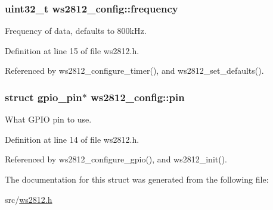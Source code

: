 \hypertarget{structws2812__config_a15634a419d7f20275ec1e6ba1215920b}{}
\subsubsection[{frequency}]{\setlength{\rightskip}{0pt plus 5cm}uint32\+\_\+t ws2812\+\_\+config\+::frequency}\label{structws2812__config_a15634a419d7f20275ec1e6ba1215920b}


Frequency of data, defaults to 800k\+Hz. 



Definition at line 15 of file ws2812.\+h.



Referenced by ws2812\+\_\+configure\+\_\+timer(), and ws2812\+\_\+set\+\_\+defaults().

\hypertarget{structws2812__config_a665ce3190145f97af1d234f9de5defc1}{}
\subsubsection[{pin}]{\setlength{\rightskip}{0pt plus 5cm}struct {\bf gpio\+\_\+pin}$\ast$ ws2812\+\_\+config\+::pin}\label{structws2812__config_a665ce3190145f97af1d234f9de5defc1}


What G\+P\+I\+O pin to use. 



Definition at line 14 of file ws2812.\+h.



Referenced by ws2812\+\_\+configure\+\_\+gpio(), and ws2812\+\_\+init().



The documentation for this struct was generated from the following file\+:\begin{DoxyCompactItemize}
\item 
src/\hyperlink{ws2812_8h}{ws2812.\+h}\end{DoxyCompactItemize}
